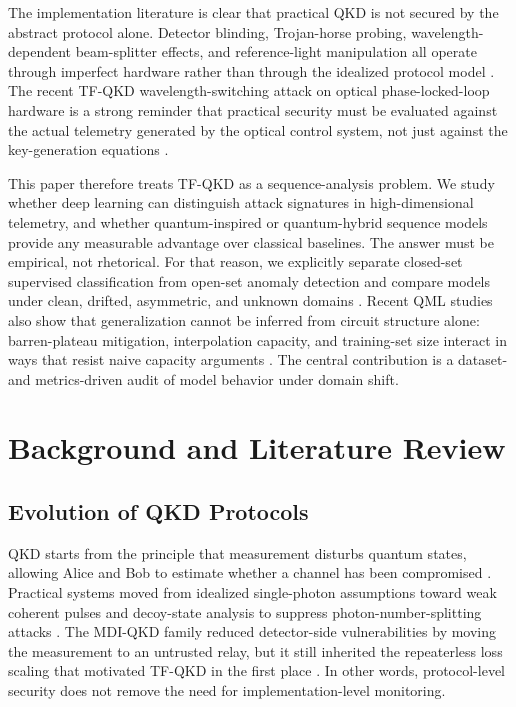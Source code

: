 The implementation literature is clear that practical QKD is not secured by the abstract protocol alone. Detector blinding, Trojan-horse probing, wavelength-dependent beam-splitter effects, and reference-light manipulation all operate through imperfect hardware rather than through the idealized protocol model \cite{lydersen, makarov, gisin, jain, li2011}. The recent TF-QKD wavelength-switching attack on optical phase-locked-loop hardware is a strong reminder that practical security must be evaluated against the actual telemetry generated by the optical control system, not just against the key-generation equations \cite{peng}.

This paper therefore treats TF-QKD as a sequence-analysis problem. We study whether deep learning can distinguish attack signatures in high-dimensional telemetry, and whether quantum-inspired or quantum-hybrid sequence models provide any measurable advantage over classical baselines. The answer must be empirical, not rhetorical. For that reason, we explicitly separate closed-set supervised classification from open-set anomaly detection and compare models under clean, drifted, asymmetric, and unknown domains \cite{vaswani2017attention, qlstm, chen, corli2024review}. Recent QML studies also show that generalization cannot be inferred from circuit structure alone: barren-plateau mitigation, interpolation capacity, and training-set size interact in ways that resist naive capacity arguments \cite{larocca2024review, gilfuster2024generalization, haug2024qfim}. The central contribution is a dataset- and metrics-driven audit of model behavior under domain shift.


\section{Background and Literature Review}
\subsection{Evolution of QKD Protocols}
QKD starts from the principle that measurement disturbs quantum states, allowing Alice and Bob to estimate whether a channel has been compromised \cite{bb84}. Practical systems moved from idealized single-photon assumptions toward weak coherent pulses and decoy-state analysis to suppress photon-number-splitting attacks \cite{pns, hwang, lo2005}. The MDI-QKD family reduced detector-side vulnerabilities by moving the measurement to an untrusted relay, but it still inherited the repeaterless loss scaling that motivated TF-QKD in the first place \cite{mdi, tfqkd}. In other words, protocol-level security does not remove the need for implementation-level monitoring.

